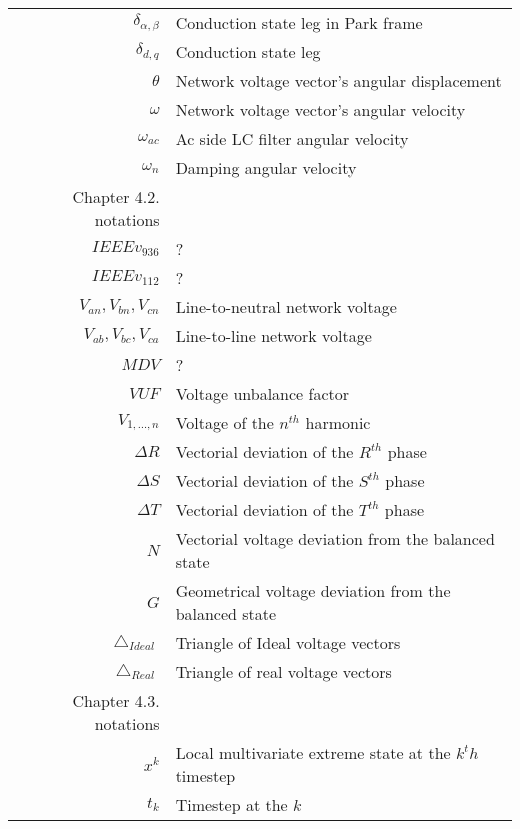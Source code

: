 \begin{longtable}{r l}
  $\delta_{\alpha,\beta}$           & Conduction state leg in Park frame\\
  $\delta_{d,q}$                    & Conduction state leg\\
  $\theta$                          & Network voltage vector’s angular displacement\\
  $\omega$                          & Network voltage vector’s angular velocity\\
  $\omega_{ac}$                     & Ac side LC filter angular velocity\\
  $\omega_{n}$                      & Damping angular velocity\\
  \hline
Chapter 4.2. notations&\\
  $IEEEv_{936}$                         & ?\\
  $IEEEv_{112}$                         & ?\\
  $V_{an},V_{bn},V_{cn}$            & Line-to-neutral network voltage\\
  $V_{ab},V_{bc},V_{ca}$            & Line-to-line network voltage\\
  $MDV$                             & ?\\
  $VUF$                             & Voltage unbalance factor\\
  $V_{1,\dots,n}$                   & Voltage of the $n^{th}$ harmonic\\
  $\Delta R$                        & Vectorial deviation of the $R^{th}$ phase\\
  $\Delta S$                        & Vectorial deviation of the $S^{th}$ phase\\
  $\Delta T$                        & Vectorial deviation of the $T^{th}$ phase\\
  $N$                               & Vectorial voltage deviation from the balanced state\\
  $G$                               & Geometrical voltage deviation from the balanced state\\
  $\bigtriangleup_{Ideal}$          & Triangle of Ideal voltage vectors\\
  $\bigtriangleup_{Real}$           & Triangle of real voltage vectors\\
  \hline
  Chapter 4.3. notations&\\
  $x^{k}$                           & Local multivariate extreme state at the $k^th$ timestep\\
  $t_k$                             & Timestep at the $k$\\

\end{longtable}
